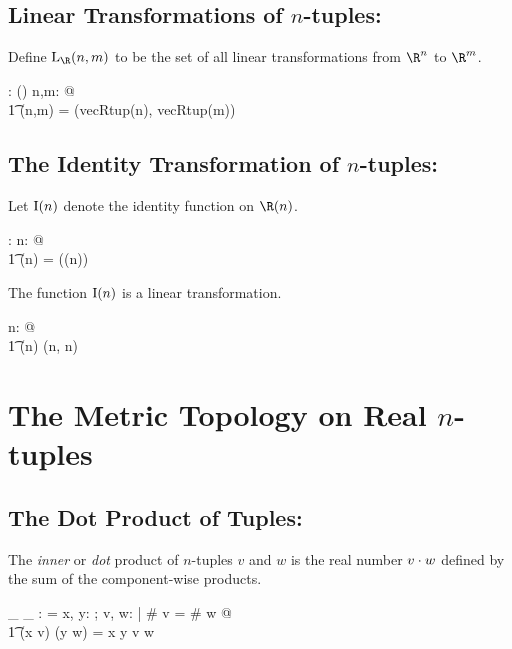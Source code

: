 \documentclass{amsart}
\begin{document}
\subsection{Linear Transformations of $n$-tuples: }

Define $\linRtup(n,m)$ to be the set of all linear transformations from $\R^n$ to $\R^m$.
\begin{axdef}
	\linRtup: \nat \cross \nat \fun \power(\Rinf \pfun \Rinf)
\where
	\forall n,m: \nat @ \\
	\t1	\linRtup(n,m) = \homVecR(vecRtup(n), vecRtup(m))
\end{axdef}

\subsection{The Identity Transformation of $n$-tuples: }

Let $\operatorname{I}(n)$ denote the identity function on $\Rtup(n)$.

\begin{axdef}
	\idRtup: \nat \fun \Rinf \pfun \Rinf
\where
	\forall n: \nat @ \\
	\t1	\idRtup(n) = \id(\Rtup(n))
\end{axdef}

\begin{remark}
The function $\operatorname{I}(n)$ is a linear transformation.

\begin{zed}
	\forall n: \nat @ \\
	\t1	\idRtup(n) \in \linRtup(n, n)
\end{zed}

\end{remark}

\section{The Metric Topology on Real $n$-tuples}

\subsection{The Dot Product of Tuples: }

The {\it inner} or {\it dot} product of $n$-tuples $v$ and $w$ is the real number $v \mathbin{\cdot} w$ 
defined by the sum of the component-wise products.

\begin{axdef}
	\_ \dotRinf \_ : \RinfDelta \fun \R
\where
	\langle \rangle \dotRinf \langle \rangle = \zeroR
\also
	\forall x, y: \R; v, w: \Rinf | \# v = \# w @ \\
	\t1	(\langle x \rangle \cat v) \dotRinf (\langle y \rangle \cat w) = x \mulR y \addR v \dotRinf w
\end{axdef}
\end{document}
